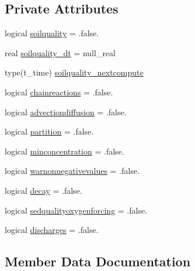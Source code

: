 \subsection*{Private Attributes}
\begin{DoxyCompactItemize}
\item 
logical \mbox{\hyperlink{structmoduleporousmediaproperties_1_1t__coupled_a63eceecbd33cda420410fff39afd7984}{soilquality}} = .false.
\item 
real \mbox{\hyperlink{structmoduleporousmediaproperties_1_1t__coupled_a08c9b5dd1180ab6802aca937dfac6199}{soilquality\+\_\+dt}} = null\+\_\+real
\item 
type(t\+\_\+time) \mbox{\hyperlink{structmoduleporousmediaproperties_1_1t__coupled_a592871b51fd913723e605cb236c47eca}{soilquality\+\_\+nextcompute}}
\item 
logical \mbox{\hyperlink{structmoduleporousmediaproperties_1_1t__coupled_a55ee5c42aef2baeffa90866aac01e3e6}{chainreactions}} = .false.
\item 
logical \mbox{\hyperlink{structmoduleporousmediaproperties_1_1t__coupled_aaae166beaf6d65d973db59509772f5fb}{advectiondiffusion}} = .false.
\item 
logical \mbox{\hyperlink{structmoduleporousmediaproperties_1_1t__coupled_a415e4c59ea100c12806bcab3aa2c22ad}{partition}} = .false.
\item 
logical \mbox{\hyperlink{structmoduleporousmediaproperties_1_1t__coupled_a035972ddacac71fbb276a33a481da8f9}{minconcentration}} = .false.
\item 
logical \mbox{\hyperlink{structmoduleporousmediaproperties_1_1t__coupled_a5a84a6d4b232ec73afb1ae78388f6d4f}{warnonnegativevalues}} = .false.
\item 
logical \mbox{\hyperlink{structmoduleporousmediaproperties_1_1t__coupled_a8b84bbcd8023bdf39e8113720c685d50}{decay}} = .false.
\item 
logical \mbox{\hyperlink{structmoduleporousmediaproperties_1_1t__coupled_a162d48125a59998b2edf0798ed42b634}{sedqualityoxygenforcing}} = .false.
\item 
logical \mbox{\hyperlink{structmoduleporousmediaproperties_1_1t__coupled_afae9b827bc34ab208248d37a3912bd6c}{discharges}} = .false.
\end{DoxyCompactItemize}


\subsection{Member Data Documentation}
\mbox{\label{structmoduleporousmediaproperties_1_1t__coupled_aaae166beaf6d65d973db59509772f5fb}} 
